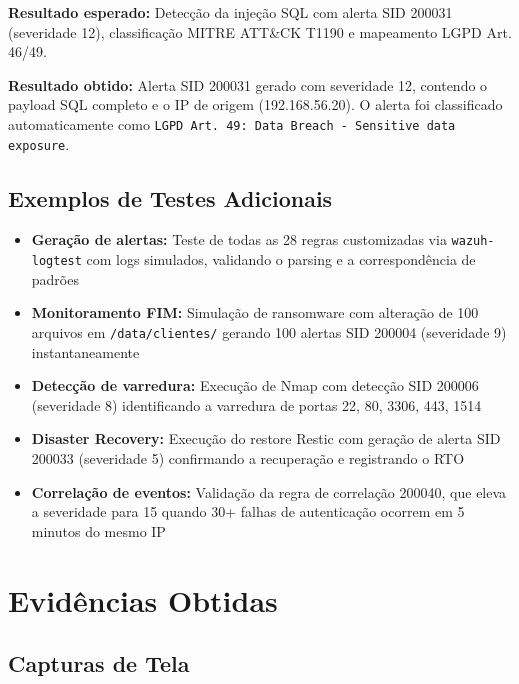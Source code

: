 \documentclass[12pt,a4paper]{article}
\begin{document}
    \textbf{Resultado esperado:} Detecção da injeção SQL com alerta SID 200031 (severidade 12), classificação MITRE ATT\&CK T1190 e mapeamento LGPD Art. 46/49.

    \textbf{Resultado obtido:} Alerta SID 200031 gerado com severidade 12, contendo o payload SQL completo e o IP de origem (192.168.56.20). O alerta foi classificado automaticamente como \texttt{LGPD Art. 49: Data Breach - Sensitive data exposure}.

    \subsection{Exemplos de Testes Adicionais}

    \begin{itemize}
        \item \textbf{Geração de alertas:} Teste de todas as 28 regras customizadas via \texttt{wazuh-logtest} com logs simulados, validando o parsing e a correspondência de padrões
        \item \textbf{Monitoramento FIM:} Simulação de ransomware com alteração de 100 arquivos em \texttt{/data/clientes/} gerando 100 alertas SID 200004 (severidade 9) instantaneamente
        \item \textbf{Detecção de varredura:} Execução de Nmap com detecção SID 200006 (severidade 8) identificando a varredura de portas 22, 80, 3306, 443, 1514
        \item \textbf{Disaster Recovery:} Execução do restore Restic com geração de alerta SID 200033 (severidade 5) confirmando a recuperação e registrando o RTO
        \item \textbf{Correlação de eventos:} Validação da regra de correlação 200040, que eleva a severidade para 15 quando 30+ falhas de autenticação ocorrem em 5 minutos do mesmo IP
    \end{itemize}

    \newpage
    \section{Evidências Obtidas}

    \subsection{Capturas de Tela}
\end{document}
